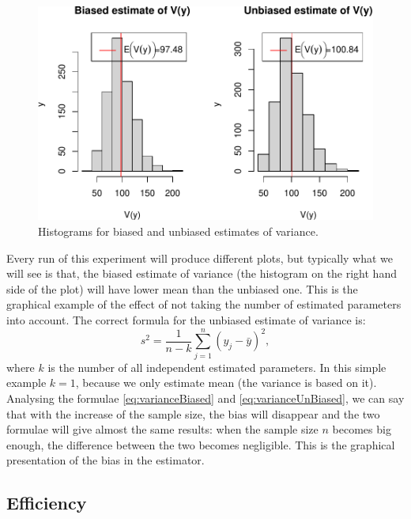 \documentclass[
]{book}
\theoremstyle{definition}
\theoremstyle{definition}
\theoremstyle{definition}
\theoremstyle{definition}
\theoremstyle{remark}
\begin{document}
\begin{figure}
\centering
\includegraphics{Svetunkov---Statistics-for-Business-Analytics_files/figure-latex/unnamed-chunk-24-1.pdf}
\caption{\label{fig:unnamed-chunk-24}Histograms for biased and unbiased estimates of variance.}
\end{figure}

Every run of this experiment will produce different plots, but typically what we will see is that, the biased estimate of variance (the histogram on the right hand side of the plot) will have lower mean than the unbiased one. This is the graphical example of the effect of not taking the number of estimated parameters into account. The correct formula for the unbiased estimate of variance is:
\begin{equation}
    s^2 = \frac{1}{n-k} \sum_{j=1}^n \left( y_j - \bar{y} \right)^2,
    \label{eq:varianceUnBiased}
\end{equation}
where \(k\) is the number of all independent estimated parameters. In this simple example \(k=1\), because we only estimate mean (the variance is based on it). Analysing the formulae \eqref{eq:varianceBiased} and \eqref{eq:varianceUnBiased}, we can say that with the increase of the sample size, the bias will disappear and the two formulae will give almost the same results: when the sample size \(n\) becomes big enough, the difference between the two becomes negligible. This is the graphical presentation of the bias in the estimator.

\hypertarget{estimatesPropertiesEfficiency}{%
\subsection{Efficiency}\label{estimatesPropertiesEfficiency}}
\end{document}
